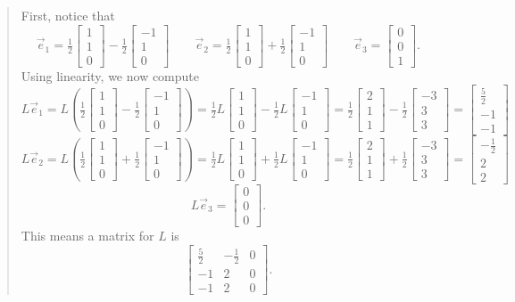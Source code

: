 \documentclass[letter]{article}
\newcommand{\mat}[1]{\begin{bmatrix}#1\end{bmatrix}}
\begin{document}
\begin{enumerate}
\begin{enumerate}
\begin{quote}
					First, notice that 
					\[
						\vec e_1=\tfrac{1}{2}\mat{1\\1\\0}-\tfrac{1}{2}\mat{-1\\1\\0}\qquad
						\vec e_2=\tfrac{1}{2}\mat{1\\1\\0}+\tfrac{1}{2}\mat{-1\\1\\0}\qquad
						\vec e_3=\mat{0\\0\\1}.
					\]
					Using linearity, we now compute
					\[
						L\vec e_1 = L\left(\tfrac{1}{2}\mat{1\\1\\0}-\tfrac{1}{2}\mat{-1\\1\\0}\right)
						=\tfrac{1}{2}L\mat{1\\1\\0}-\tfrac{1}{2}L\mat{-1\\1\\0}
						=\tfrac{1}{2}\mat{2\\1\\1}-\tfrac{1}{2}\mat{-3\\3\\3}= \mat{\tfrac{5}{2}\\-1\\-1}
					\]
					\[
						L\vec e_2 = L\left(\tfrac{1}{2}\mat{1\\1\\0}+\tfrac{1}{2}\mat{-1\\1\\0}\right)
						=\tfrac{1}{2}L\mat{1\\1\\0}+\tfrac{1}{2}L\mat{-1\\1\\0}
						=\tfrac{1}{2}\mat{2\\1\\1}+\tfrac{1}{2}\mat{-3\\3\\3}= \mat{-\tfrac{1}{2}\\2\\2}
					\]
					\[
						L\vec e_3=\mat{0\\0\\0}.
					\]
					This means a matrix for $L$ is
					\[
						\mat{\tfrac{5}{2}&-\tfrac{1}{2}&0\\-1&2&0\\-1&2&0}.
					\]
				\end{quote}

\end{enumerate}
\end{enumerate}
\end{document}
